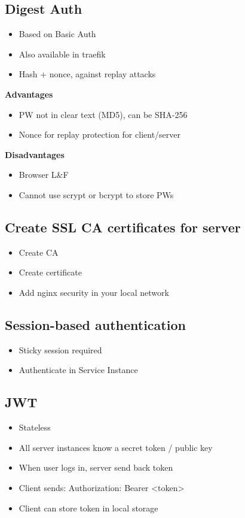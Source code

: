 \subsection{Digest Auth}
\begin{itemize}
    \item Based on Basic Auth
    \item Also available in traefik
    \item Hash + nonce, against replay attacks
\end{itemize}
\textbf{Advantages}
\begin{itemize}
    \item PW not in clear text (MD5), can be SHA-256
    \item Nonce for replay protection for client/server
\end{itemize}
\textbf{Disadvantages}
\begin{itemize}
    \item Browser L\&F
    \item Cannot use scrypt or bcrypt to store PWs
\end{itemize}

\subsection{Create SSL CA certificates for server}
\begin{itemize}
    \item Create CA
    \item Create certificate
    \item Add nginx security in your local network
\end{itemize}

\subsection{Session-based authentication}
\begin{itemize}
    \item Sticky session required
    \item Authenticate in Service Instance
\end{itemize}

\subsection{JWT}
\begin{itemize}
    \item Stateless
    \item All server instances know a secret token / public key
    \item When user logs in, server send back token
    \item Client sends: Authorization: Bearer <token>
    \item Client can store token in local storage
\end{itemize}

